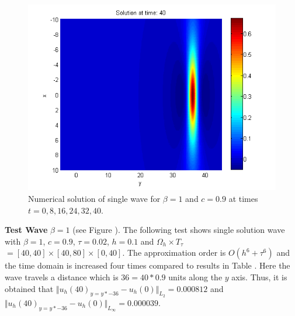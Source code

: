 \documentclass[11pt,a4paper,twoside]{article}
\begin{document}
\begin{figure}[!htbp]
\begin{minipage}[b]{0.31\linewidth}
	\end{minipage}
	\begin{minipage}[b]{0.31\linewidth}
		 \includegraphics[width=\linewidth]{Pictures/Solution1_t=40.png}
	\end{minipage}
	\caption{Numerical solution of single wave for $\beta=1$ and $c = 0.9$ at times $t=0,8,16,24,32,40$.}
	\label{fig:oneWaveA}
\end{figure}

\textbf{Test Wave} {\boldmath$\beta = 1$} (see Figure ). The following test shows single solution wave with $\beta = 1$, $c = 0.9$, $\tau = 0.02$, $h = 0.1$ and $\Omega_h \times T_{\tau}$ $= [40, 40] \times [40, 80] \times [0, 40]$. The approximation order is $O(h^6 + \tau^6)$ and the time domain is increased four times compared to results in Table . Here the wave travels a distance which is $36 = 40*0.9$ units along the $y$ axis. Thus, it is obtained that $\Vert u_h(40)_{y = y*-36} - u_h(0) \Vert_{L_2} = 0.000812$ and $\Vert u_h(40)_{y = y*-36} - u_h(0) \Vert_{L_\infty} = 0.000039$.
\end{document}
